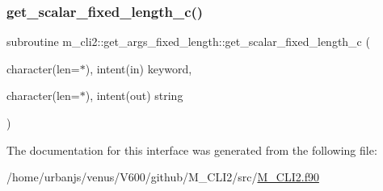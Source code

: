 \mbox{\label{interfacem__cli2_1_1get__args__fixed__length_a3dec369db225fffd4f9d71833686e19a}} 
\subsubsection{\texorpdfstring{get\+\_\+scalar\+\_\+fixed\+\_\+length\+\_\+c()}{get\_scalar\_fixed\_length\_c()}}
{\footnotesize\ttfamily subroutine m\+\_\+cli2\+::get\+\_\+args\+\_\+fixed\+\_\+length\+::get\+\_\+scalar\+\_\+fixed\+\_\+length\+\_\+c (\begin{DoxyParamCaption}\item[{character(len=$\ast$), intent(in)}]{keyword,  }\item[{character(len=$\ast$), intent(out)}]{string }\end{DoxyParamCaption})\hspace{0.3cm}{\ttfamily [private]}}



The documentation for this interface was generated from the following file\+:\begin{DoxyCompactItemize}
\item 
/home/urbanjs/venus/\+V600/github/\+M\+\_\+\+C\+L\+I2/src/\mbox{\hyperlink{M__CLI2_8f90}{M\+\_\+\+C\+L\+I2.\+f90}}\end{DoxyCompactItemize}
